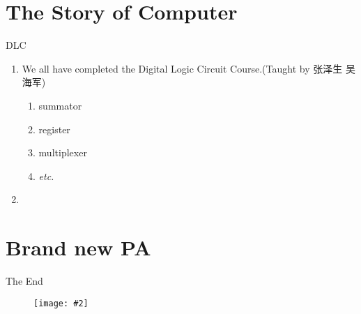 \documentclass[handout]{beamer}
\newcommand{\fignocaption}[2]{
	\begin{figure}[htp]
		\centering
		\texttt{[image: \#2]}
	\end{figure}
}
\begin{document}
%	
%	
%	



\section{The Story of Computer}
\begin{frame}{DLC}
	\begin{enumerate}
		\item We all have completed the Digital Logic Circuit Course.(Taught by 张泽生 吴海军)
			\begin{enumerate}
				\item summator
				\item register
				\item multiplexer
				\item \textit{etc.}
			\end{enumerate}
		\item 
	\end{enumerate}
\end{frame}

\section{Brand new PA}

\begin{frame}{The End}
	\fignocaption{scale=0.8}{studentFeedback.png}
\end{frame}
\end{document}
